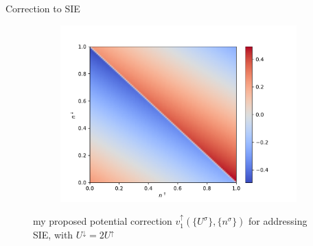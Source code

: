 \documentclass[xcolor=table,aspectratio=169]{beamer}
\newcommand{\bra}[1]{\langle #1|}
\newcommand{\ket}[1]{|#1\rangle}
\numberwithin{equation}{section}
\begin{document}
\begin{frame}{Correction to SIE}
\begin{figure}[t!]
\begin{subfigure}[b]{0.3\columnwidth}
            \caption{}
            \label{fig:novel_u_potential}
        \end{subfigure}
        \begin{subfigure}[b]{0.3\columnwidth}
            \includegraphics[width=\columnwidth]{figures/novel_u_potential_2d.pdf}
            \caption{}
            \label{fig:novel_u_potential_2d}
        \end{subfigure}
        \caption{my proposed potential correction $v^\uparrow_1(\{U^\sigma\}, \{n^\sigma\})$ for addressing SIE, with $U^\downarrow = 2 U^\uparrow$}
    \end{figure}

\end{frame}
\end{document}
